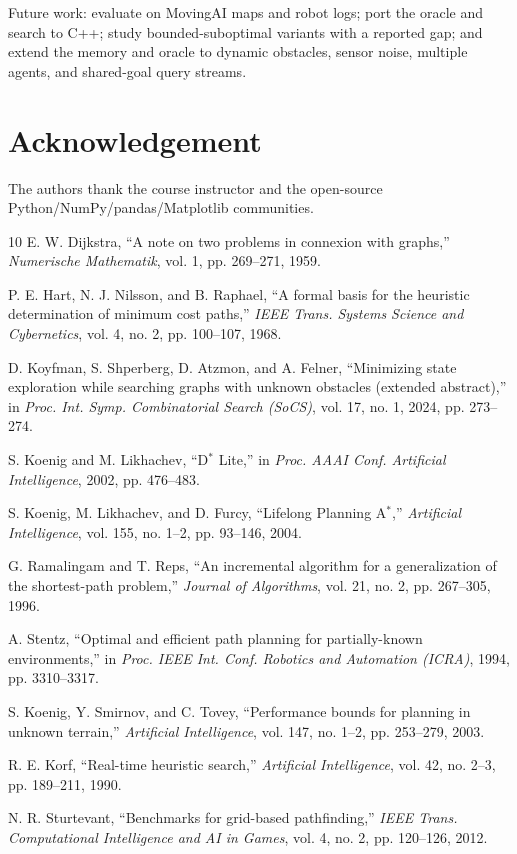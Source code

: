 \documentclass[conference]{IEEEtran}
\begin{document}
Future work: evaluate on MovingAI maps and robot logs; port the oracle and search to C++; study bounded-suboptimal variants with a reported gap; and extend the memory and oracle to dynamic obstacles, sensor noise, multiple agents, and shared-goal query streams.

\section*{Acknowledgement}
The authors thank the course instructor and the open-source Python/NumPy/pandas/Matplotlib communities.

\newpage
\begin{thebibliography}{10}
E. W. Dijkstra, ``A note on two problems in connexion with graphs,'' \emph{Numerische Mathematik}, vol. 1, pp. 269--271, 1959.

P. E. Hart, N. J. Nilsson, and B. Raphael, ``A formal basis for the heuristic determination of minimum cost paths,'' \emph{IEEE Trans. Systems Science and Cybernetics}, vol. 4, no. 2, pp. 100--107, 1968.

D. Koyfman, S. Shperberg, D. Atzmon, and A. Felner, ``Minimizing state exploration while searching graphs with unknown obstacles (extended abstract),'' in \emph{Proc. Int. Symp. Combinatorial Search (SoCS)}, vol. 17, no. 1, 2024, pp. 273--274.

S. Koenig and M. Likhachev, ``D$^*$ Lite,'' in \emph{Proc. AAAI Conf. Artificial Intelligence}, 2002, pp. 476--483.

S. Koenig, M. Likhachev, and D. Furcy, ``Lifelong Planning A$^*$,'' \emph{Artificial Intelligence}, vol. 155, no. 1--2, pp. 93--146, 2004.

G. Ramalingam and T. Reps, ``An incremental algorithm for a generalization of the shortest-path problem,'' \emph{Journal of Algorithms}, vol. 21, no. 2, pp. 267--305, 1996.

A. Stentz, ``Optimal and efficient path planning for partially-known environments,'' in \emph{Proc. IEEE Int. Conf. Robotics and Automation (ICRA)}, 1994, pp. 3310--3317.

S. Koenig, Y. Smirnov, and C. Tovey, ``Performance bounds for planning in unknown terrain,'' \emph{Artificial Intelligence}, vol. 147, no. 1--2, pp. 253--279, 2003.

R. E. Korf, ``Real-time heuristic search,'' \emph{Artificial Intelligence}, vol. 42, no. 2--3, pp. 189--211, 1990.

N. R. Sturtevant, ``Benchmarks for grid-based pathfinding,'' \emph{IEEE Trans. Computational Intelligence and AI in Games}, vol. 4, no. 2, pp. 120--126, 2012.
\end{thebibliography}
\end{document}
